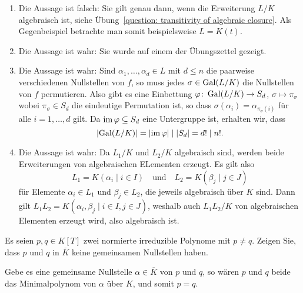 \begin{solution}
\begin{enumerate}
    \item
      Die Aussage ist falsch:
      Sie gilt genau dann, wenn die Erweiterung $L/K$ algebraisch ist, siehe Übung~\ref{question: transitivity of algebraic closure}.
      Als Gegenbeispiel betrachte man somit beispielsweise $L = K(t)$.
      
    \item
      Die Aussage ist wahr:
      Sie wurde auf einem der Übungszettel gezeigt.
      
    \item
      Die Aussage ist wahr:
      Sind $\alpha_1, \dotsc, \alpha_d \in L$ mit $d \leq n$ die paarweise verschiedenen Nullstellen von $f$, so muss jedes $\sigma \in \operatorname{Gal}(L/K)$ die Nullstellen von $f$ permutieren.
      Also gibt es eine Einbettung $\varphi \colon \operatorname{Gal}(L/K) \to S_d$, $\sigma \mapsto \pi_\sigma$ wobei $\pi_\sigma \in S_d$ die eindeutige Permutation ist, so dass $\sigma(\alpha_i) = \alpha_{\pi_\sigma(i)}$ für alle $i = 1, \dotsc, d$ gilt.
      Da $\operatorname{im} \varphi \subseteq S_d$ eine Untergruppe ist, erhalten wir, dass
      \[
              |{\operatorname{Gal}(L/K)}|
        =     |{\operatorname{im} \varphi}|
        \mid  |S_d|
        =     d!
        \mid  n!.
      \]
    
    \item
      Die Aussage ist wahr:
      Da $L_1/K$ und $L_2/K$ algebraisch sind, werden beide Erweiterungen von algebraischen ELementen erzeugt.
      Es gilt also
      \[
        L_1 = K(\alpha_i \mid i \in I)
        \quad\text{und}\quad
        L_2 = K(\beta_j \mid j \in J)
      \]
      für Elemente $\alpha_i \in L_1$ und $\beta_j \in L_2$, die jeweils algebraisch über $K$ sind.
      Dann gilt $L_1 L_2 = K(\alpha_i, \beta_j \mid i \in I, j \in J)$, weshalb auch $L_1 L_2/K$ von algebraischen Elementen erzeugt wird, also algebraisch ist.
  \end{enumerate}
\end{solution}


\begin{question}[subtitle = Gemeinsame Nullstellen irreduzibler Polynome]
  Es seien $p, q \in K[T]$ zwei normierte irreduzible Polynome mit $p \neq q$.
  Zeigen Sie, dass $p$ und $q$ in $\overline{K}$ keine gemeinsamen Nullstellen haben.
\end{question}


\begin{solution}
  Gebe es eine gemeinsame Nullstelle $\alpha \in \overline{K}$ von $p$ und $q$, so wären $p$ und $q$ beide das Minimalpolynom von $\alpha$ über $K$, und somit $p = q$.
\end{solution}


